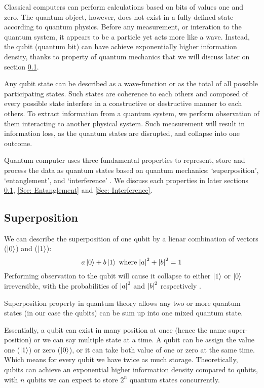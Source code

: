 Classical computers can perform calculations based on bits of values one and zero.
The quantum object, however, does not exist in a fully defined state according to quantum physics.
Before any measurement, or interation to the quantum system, it appears to be a particle yet acts more like a wave.
Instead, the qubit (quantum bit) can have achieve exponentially higher information density, thanks to property of quantum mechanics that we will discuss later on section \ref{Sec: Superposition}.

Any qubit state can be described as a wave-function or as the total of all possible participating states.
Such states are coherence to each others and composed of every possible state interfere in a constructive or destructive manner to each others.
To extract information from a quantum system, we perform observation of them interacting to another physical system.
Such measurement will result in information loss, as the quantum states are disrupted, and collapse into one outcome.

Quantum computer uses three fundamental properties to represent, store and process the data as quantum states based on quantum mechanics: `superposition', `entanglement', and `interference' \cite{nationalacademiesofsciencesQuantumComputingProgress2019}.
We discuss each properties in later sections \ref{Sec: Superposition}, \ref{Sec: Entanglement} and \ref{Sec: Interference}.

\subsection{Superposition} \label{Sec: Superposition}

We can describe the superposition of one qubit by a lienar combination of vectors ($\left\vert{0}\right\rangle$) and ($\left\vert{1}\right\rangle$):
\begin{equation}
    a \left\vert{0}\right\rangle + b \left\vert{1}\right\rangle
    \;\text{where}\;
    \abs{a}^2 + \abs{b}^2 = 1
\end{equation}
Performing observation to the qubit will cause it collapse to either $\left\vert{1}\right\rangle$ or $\left\vert{0}\right\rangle$ irreversible, with the probabilities of $\abs{a}^2$ and $\abs{b}^2$ respectively \cite{sutorDancingQubitsHow2019a}.

Superposition property in quantum theory allows any two or more quantum states (in our case the qubits) can be sum up into one mixed quantum state.

Essentially, a qubit can exist in many position at once (hence the name super-position) or we can say multiple state at a time.
A qubit can be assign the value one ($\left\vert{1}\right\rangle$) or zero ($\left\vert{0}\right\rangle$), or it can take both value of one or zero at the same time.
Which means for every qubit we have twice as much storage.
Theoretically, qubits can achieve an exponential higher information density compared to qubits, with $n$ qubits we can expect to store $2^n$ quantum states concurrently.

